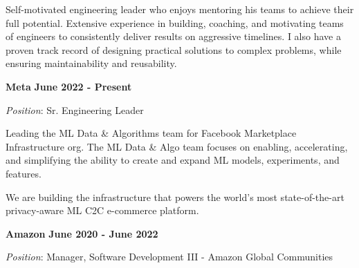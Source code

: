 \documentclass{article}
\begin{document}
\par
\vspace{2\baselineskip}
\par
Self-motivated engineering leader who enjoys mentoring his teams to achieve their full potential. Extensive experience in building, coaching, and motivating teams of engineers to consistently deliver results on aggressive timelines. I also have a proven track record of designing practical solutions to complex problems, while ensuring maintainability and reusability.
\par
\vspace{\baselineskip}
\par
\vspace{\baselineskip}
{\bf Meta}
\hfill {\bf June 2022 - Present}
\vspace{.03in}
\par
{\it Position}: Sr. Engineering Leader
\vspace{\baselineskip}
\par
Leading the ML Data \& Algorithms team for Facebook Marketplace Infrastructure org. The ML Data \& Algo team focuses on enabling, accelerating, and simplifying the ability to create and expand ML models, experiments, and features. 
\vspace{\baselineskip}
\par
We are building the infrastructure that powers the world's most state-of-the-art privacy-aware ML C2C e-commerce platform.
\par
\vspace{\baselineskip}
{\bf Amazon}
\hfill {\bf June 2020 - June 2022}
\vspace{.03in}
\par
{\it Position}: Manager, Software Development III - Amazon Global Communities
\vspace{\baselineskip}
\par
\end{document}
